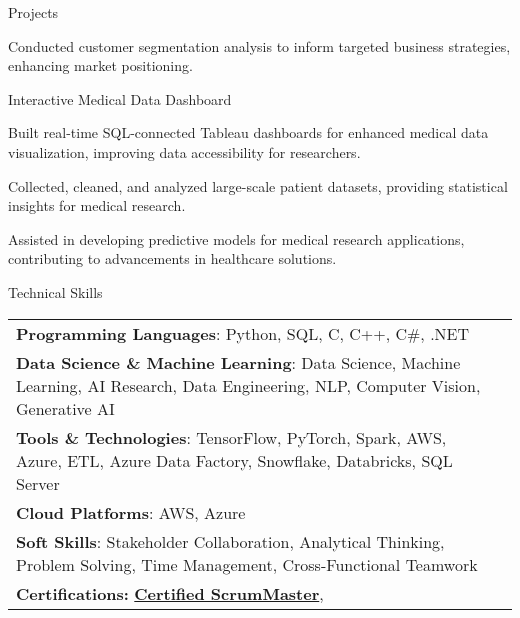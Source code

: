 \documentclass{resume} %
\begin{document}
\begin{rSection}{Projects}
\begin{rSubsection}
                                    \item Conducted customer segmentation analysis to inform targeted business strategies, enhancing market positioning.
                            \end{rSubsection}
                    \begin{rSubsection}
                                    {Interactive Medical Data Dashboard}
                                {}{}{}
                                    \item Built real{-}time SQL{-}connected Tableau dashboards for enhanced medical data visualization, improving data accessibility for researchers.
                                    \item Collected, cleaned, and analyzed large{-}scale patient datasets, providing statistical insights for medical research.
                                    \item Assisted in developing predictive models for medical research applications, contributing to advancements in healthcare solutions.
                            \end{rSubsection}
            \end{rSection}

    \begin{rSection}{Technical Skills}
        \begin{tabular}{ @{} l @{\hspace{1ex}} l }
                                \textbf{Programming Languages}: Python, SQL, C, C++, C\#, .NET\\
                                \textbf{Data Science \& Machine Learning}: Data Science, Machine Learning, AI Research, Data Engineering, NLP, Computer Vision, Generative AI\\
                                \textbf{Tools \& Technologies}: TensorFlow, PyTorch, Spark, AWS, Azure, ETL, Azure Data Factory, Snowflake, Databricks, SQL Server\\
                                \textbf{Cloud Platforms}: AWS, Azure\\
                                \textbf{Soft Skills}: Stakeholder Collaboration, Analytical Thinking, Problem Solving, Time Management, Cross{-}Functional Teamwork\\
                        \textbf{Certifications:} 
                                            \href{}{\textbf{Certified ScrumMaster}},\\
                                 
        \end{tabular}
    \end{rSection}
 
\end{document}
